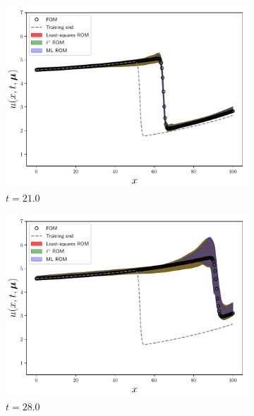 \documentclass[3p,computermodern,10pt]{elsarticle}
\begin{document}
\begin{figure}
\begin{center}
\begin{subfigure}[t]{0.24\textwidth}
\includegraphics[trim={0cm 0cm 0cm 0cm},clip,width=1.0\linewidth]{code/burgers/synapse_models/elu/results/usol_0005.pdf} 
\caption{$t=21.0$}
\end{subfigure}
\begin{subfigure}[t]{0.24\textwidth}
\includegraphics[trim={0cm 0cm 0cm 0cm},clip,width=1.0\linewidth]{code/burgers/synapse_models/elu/results/usol_0007.pdf} 
\caption{$t=28.0$}
\end{subfigure}
\begin{subfigure}[t]{0.24\textwidth}

\end{subfigure}
\end{center}
\end{figure}
\end{document}
